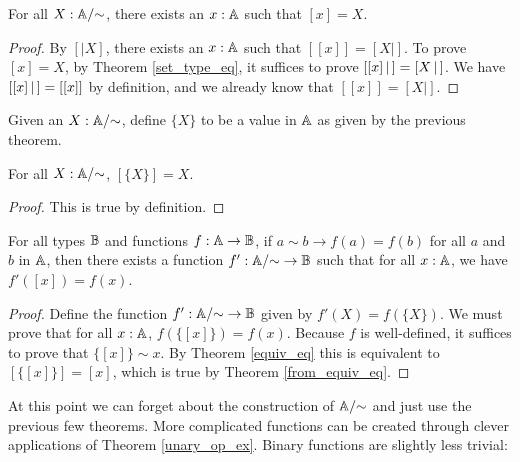 \documentclass[../../math.tex]{subfiles}
\begin{document}
\begin{theorem}
    For all $X : \mathbb{A}/{\sim}$, there exists an $x : \mathbb{A}$ such that $[x] = X$.
\end{theorem}
\begin{proof}
    By $[|X]$, there exists an $x : \mathbb{A}$ such that $[ [x]] = [X|]$.  To prove
    $[x] = X$, by Theorem \ref{set_type_eq}, it suffices to prove $[ [x]\, |\,] =
    [ X\, |\,]$.  We have $[ [x]\, |\,] = [ [x]]$ by definition, and we already know
    that $[ [x]] = [X|]$.
\end{proof}

\begin{definition}
    Given an $X : \mathbb{A}/{\sim}$, define $\{X\}$ to be a value in $\mathbb{A}$ as given by
    the previous theorem.
\end{definition}

\begin{theorem} \label{from_equiv_eq}
    For all $X : \mathbb{A}/{\sim}$, $[\{X\}] = X$.
\end{theorem}
\begin{proof}
    This is true by definition.
\end{proof}

\begin{theorem} \label{unary_op_ex}
    For all types $\mathbb{B}$ and functions $f : \mathbb{A} \to \mathbb{B}$, if $a \sim b \to f(a) =
    f(b)$ for all $a$ and $b$ in $\mathbb{A}$, then there exists a function $f' :
    \mathbb{A}/{\sim} \to \mathbb{B}$ such that for all $x : \mathbb{A}$, we have $f'([x]) = f(x)$.
\end{theorem}
\begin{proof}
    Define the function $f' : \mathbb{A}/{\sim} \to \mathbb{B}$ given by $f'(X) = f(\{X\})$.  We
    must prove that for all $x : \mathbb{A}$, $f(\{[x]\}) = f(x)$.  Because $f$ is
    well-defined, it suffices to prove that $\{[x]\} \sim x$.  By Theorem
    \ref{equiv_eq} this is equivalent to $[\{[x]\}] = [x]$, which is true by
    Theorem \ref{from_equiv_eq}.
\end{proof}

At this point we can forget about the construction of $\mathbb{A}/{\sim}$ and just use
the previous few theorems.  More complicated functions can be created through
clever applications of Theorem \ref{unary_op_ex}.  Binary functions are slightly
less trivial:
\end{document}
